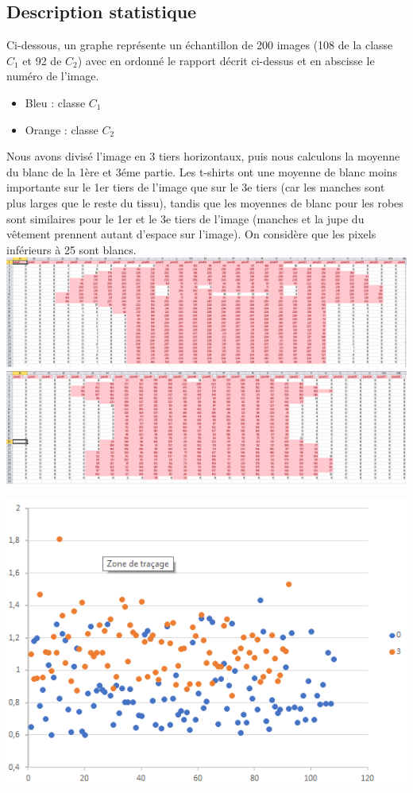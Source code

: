 \documentclass[a4paper,10pt]{article}
\begin{document}
	\subsection{Description statistique}
		Ci-dessous, un graphe représente un échantillon de 200 images (108 de la classe $C_1$ et 92 de $C_2$) avec en ordonné le rapport décrit ci-dessus et en abscisse le numéro de l'image. 
		\begin{itemize}
			\item Bleu : classe $C_1$
			\item Orange : classe $C_2$
		\end{itemize}
		Nous avons divisé l’image en 3 tiers horizontaux, puis nous calculons la moyenne du blanc de la 1ère et 3éme partie. Les t-shirts ont une moyenne de blanc moins importante sur le 1er tiers de l'image que sur le 3e tiers (car les manches sont plus larges que le reste du tissu), tandis que les moyennes de blanc pour les robes sont similaires pour le 1er et le 3e tiers de l'image (manches et la jupe du vêtement prennent autant d'espace sur l'image). On considère que les pixels inférieurs à 25 sont blancs.\\

		\includegraphics[scale = 0.25]{fichiers/ex_tshirt.PNG}
		\includegraphics[scale = 0.25]{fichiers/ex_robe.PNG}
		\vfill\begin{center} \includegraphics[scale = 0.6]{fichiers/rapport.PNG} \end{center}\vfill
		
\end{document}
